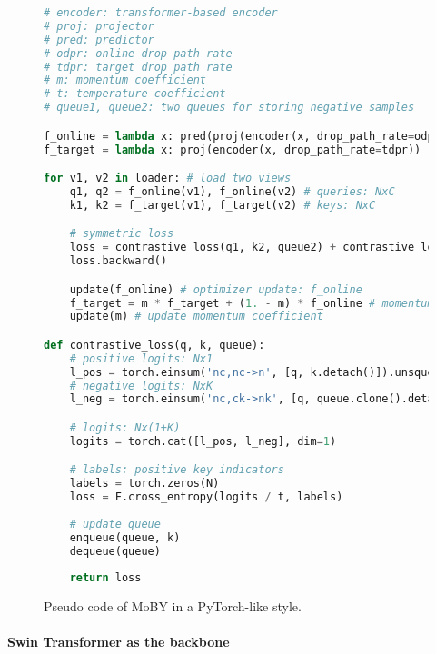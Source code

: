 \documentclass{article}
\begin{document}
\begin{figure}
\centering
\begin{algorithm}[H]
\caption{Pseudo code of MoBY in a PyTorch-like style.}
\label{algorithm-moby}
\begin{lstlisting}[language=python,tabsize=4,showtabs]
# encoder: transformer-based encoder
# proj: projector
# pred: predictor
# odpr: online drop path rate
# tdpr: target drop path rate
# m: momentum coefficient
# t: temperature coefficient
# queue1, queue2: two queues for storing negative samples

f_online = lambda x: pred(proj(encoder(x, drop_path_rate=odpr)))
f_target = lambda x: proj(encoder(x, drop_path_rate=tdpr))

for v1, v2 in loader: # load two views
    q1, q2 = f_online(v1), f_online(v2) # queries: NxC
    k1, k2 = f_target(v1), f_target(v2) # keys: NxC

    # symmetric loss
    loss = contrastive_loss(q1, k2, queue2) + contrastive_loss(q2, k1, queue1)
    loss.backward()

    update(f_online) # optimizer update: f_online
    f_target = m * f_target + (1. - m) * f_online # momentum update: f_target
    update(m) # update momentum coefficient

def contrastive_loss(q, k, queue):
    # positive logits: Nx1
    l_pos = torch.einsum('nc,nc->n', [q, k.detach()]).unsqueeze(-1)
    # negative logits: NxK
    l_neg = torch.einsum('nc,ck->nk', [q, queue.clone().detach()])

    # logits: Nx(1+K)
    logits = torch.cat([l_pos, l_neg], dim=1)

    # labels: positive key indicators
    labels = torch.zeros(N)
    loss = F.cross_entropy(logits / t, labels)
    
    # update queue
    enqueue(queue, k)
    dequeue(queue)
    
    return loss
\end{lstlisting}
\end{algorithm}
\end{figure}

\paragraph{Swin Transformer as the backbone}
\end{document}

